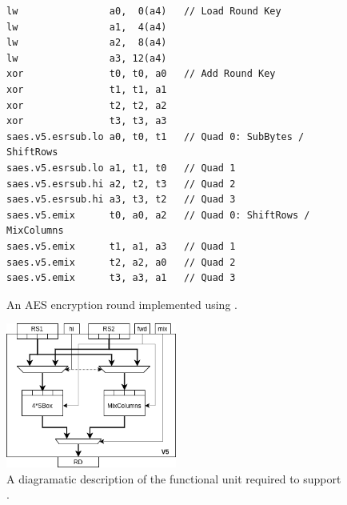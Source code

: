 \begin{figure}[!h]
\begin{lstlisting}[language=pseudo,style=block]
lw                a0,  0(a4)   // Load Round Key
lw                a1,  4(a4)
lw                a2,  8(a4)
lw                a3, 12(a4)
xor               t0, t0, a0   // Add Round Key
xor               t1, t1, a1
xor               t2, t2, a2
xor               t3, t3, a3
saes.v5.esrsub.lo a0, t0, t1   // Quad 0: SubBytes / ShiftRows
saes.v5.esrsub.lo a1, t1, t0   // Quad 1
saes.v5.esrsub.hi a2, t2, t3   // Quad 2
saes.v5.esrsub.hi a3, t3, t2   // Quad 3
saes.v5.emix      t0, a0, a2   // Quad 0: ShiftRows / MixColumns
saes.v5.emix      t1, a1, a3   // Quad 1
saes.v5.emix      t2, a2, a0   // Quad 2
saes.v5.emix      t3, a3, a1   // Quad 3
\end{lstlisting}
\caption{
  An AES encryption round implemented using .
}
\label{fig:v5:round}
\end{figure}

\newpage

\begin{figure}[!h]
\centering
\includegraphics[width={0.5\textwidth}]{diagrams/ise-datapath-v5.png}
\caption{
  A diagramatic description of the functional unit required to support .
}
\label{fig:v5:fu}
\end{figure}

